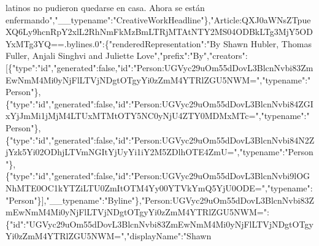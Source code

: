 latinos no pudieron quedarse en casa. Ahora se están
enfermando","\_\_typename":"CreativeWorkHeadline"\},"Article:QXJ0aWNsZTpueXQ6Ly9hcnRpY2xlL2RhNmFkMzBmLTRjMTAtNTY2MS04ODBkLTg3MjY5ODYxMTg3YQ==.bylines.0":\{"renderedRepresentation":"By
Shawn Hubler, Thomas Fuller, Anjali Singhvi and Juliette
Love","prefix":"By","creators":{[}\{"type":"id","generated":false,"id":"Person:UGVyc29uOm55dDovL3BlcnNvbi83ZmEwNmM4Mi0yNjFlLTVjNDgtOTgyYi0zZmM4YTRlZGU5NWM=","typename":"Person"\},\{"type":"id","generated":false,"id":"Person:UGVyc29uOm55dDovL3BlcnNvbi84ZGIxYjJmMi1jMjM4LTUxMTMtOTY5NC0yNjU4ZTY0MDMxMTc=","typename":"Person"\},\{"type":"id","generated":false,"id":"Person:UGVyc29uOm55dDovL3BlcnNvbi84N2ZjYzk5Yi02ODhjLTVmNGItYjUyYi1iY2M5ZDlhOTE4ZmU=","typename":"Person"\},\{"type":"id","generated":false,"id":"Person:UGVyc29uOm55dDovL3BlcnNvbi9lOGNhMTE0OC1kYTZiLTU0ZmItOTM4Yy00YTVkYmQ5YjU0ODE=","typename":"Person"\}{]},"\_\_typename":"Byline"\},"Person:UGVyc29uOm55dDovL3BlcnNvbi83ZmEwNmM4Mi0yNjFlLTVjNDgtOTgyYi0zZmM4YTRlZGU5NWM=":\{"id":"UGVyc29uOm55dDovL3BlcnNvbi83ZmEwNmM4Mi0yNjFlLTVjNDgtOTgyYi0zZmM4YTRlZGU5NWM=","displayName":"Shawn
